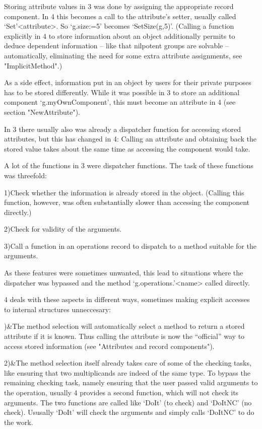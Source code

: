 Storing attribute values in {\GAP}3 was done by assigning the appropriate
record component. In {\GAP}4 this becomes a call to the attribute's setter,
usually called `Set'<attribute>. So `g.size:=5' becomes `SetSize(g,5)'.
(Calling a function explicitly in {\GAP}4 to store information about an 
object additionally permits {\GAP} to deduce dependent information -- like
that nilpotent groups are solvable -- automatically, eliminating the need
for some extra attribute assignments, see "ImplicitMethod".)

As a side effect, information put in an object by users for their
private purposes has to be stored differently. While it was possible in
{\GAP}3 to store an additional component `g.myOwnComponent', this must
become an attribute in {\GAP}4 (see section "NewAttribute").

In {\GAP}3 there usually also was already a dispatcher function for
accessing stored attributes, but 
this has changed in {\GAP}4: Calling
an attribute and obtaining back the stored value takes about the same time
as accessing the component would take.


A lot of the functions in {\GAP}3 were dispatcher functions. The task of
these functions was threefold:

1)\quad Check whether the information is already stored in the object.
(Calling this function, however, was often substantially slower
than accessing the component directly.)

2)\quad Check for validity of the arguments.

3)\quad Call a function in an operations record to dispatch to a method suitable
for the arguments.

As these features were sometimes unwanted, this lead to situations where
the dispatcher was bypassed and the method `g.operations.'<name> called
directly.

{\GAP}4 deals with these aspects in different ways, sometimes making
explicit accesses to internal structures unneccesary:

)&The method selection will automatically select a method to return a
stored attribute if it is known. Thus calling the attribute is now the
``official'' way to access stored information (see "Attributes and record
components").

2)&The method selection itself already takes care of some of the checking
tasks, like ensuring that two multiplicands are indeed of the same type. To
bypass the remaining checking task, namely ensuring that the user passed
valid arguments to the operation, usually {\GAP}4 provides a second
function, which will not check its arguments.
The two functions are called like `DoIt' (to check) and `DoItNC' (no
check). Ususally `DoIt' will check the arguments and simply calls `DoItNC'
to do the work.

